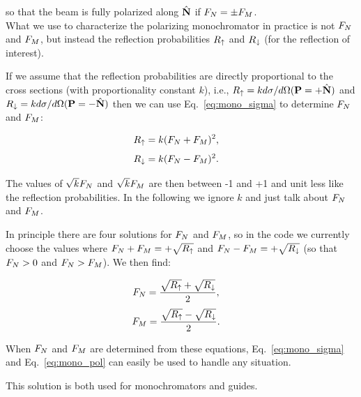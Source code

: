 so that the beam is fully polarized along $\hat{\mathbf{N}}$ if $F_N = \pm F_M$. \\

What we use to characterize the polarizing monochromator in practice
is not $F_N$ and $F_M$, but instead the reflection probabilities $R_\uparrow$
and $R_\downarrow$ (for the reflection of interest).

If we assume that the reflection probabilities are directly proportional to
the cross sections (with proportionality constant $k$), i.e., $R_\uparrow = k
d\sigma/d\Omega(\mathbf{P}=+\hat{\mathbf{N}})$ and $R_\downarrow = k d\sigma/d\Omega(\mathbf{P}=-\hat{\mathbf{N}})$ then we can
use Eq.~\ref{eq:mono_sigma} to determine $F_N$ and $F_M$:

\begin{equation}
  \label{eq:mono_up}
  \begin{aligned}
  R_\uparrow &=  k (F_N + F_M)^2,
  \end{aligned}
\end{equation}
\begin{equation}
  \label{eq:mono_down}
  \begin{aligned}
  R_\downarrow &=  k (F_N - F_M)^2.
  \end{aligned}
\end{equation}

The values of $\sqrt{k}F_N$ and $\sqrt{k}F_M$ are then between -1 and +1 and
unit less like the reflection probabilities. In the following we ignore $k$ and
just talk about $F_N$ and $F_M$.

In principle there are four solutions for $F_N$ and $F_M$, so in the code we
currently choose the values where $F_N + F_M = +\sqrt{R_\uparrow}$ and $F_N - F_M =
+\sqrt{R_\downarrow}$ (so that $F_N>0$ and $F_N>F_M$). We then find:

\begin{equation}
  \label{eq:mono_nuc}
  \begin{aligned}
  F_N &=  \frac{\sqrt{R_\uparrow} + \sqrt{R_\downarrow}}{2},
  \end{aligned}
\end{equation}
\begin{equation}
  \label{eq:mono_mag}
  \begin{aligned}
  F_M &=  \frac{\sqrt{R_\uparrow} - \sqrt{R_\downarrow}}{2}.
  \end{aligned}
\end{equation}

When $F_N$ and $F_M$ are determined from these equations,
Eq.~\ref{eq:mono_sigma} and Eq.~\ref{eq:mono_pol} can easily be used to handle
any situation.

This solution is both used for monochromators and guides.

